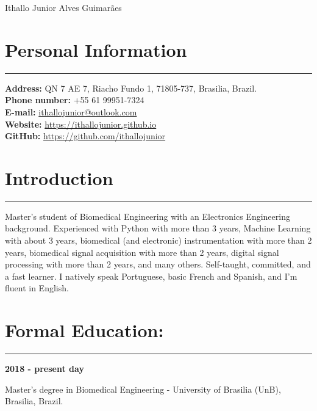\documentclass[11pt]{article}
\begin{document}
\begin{center}
\huge{Ithallo Junior Alves Guimarães}
\end{center}

\section{Personal Information}
\hrule \vspace{0.1cm}

\begin{addmargin}{0.5cm}

\textbf{Address:}  QN 7 AE 7, Riacho Fundo 1, 71805-737, Brasilia, Brazil. \\
\textbf{Phone number:}  +55 61 99951-7324 \\
\textbf{E-mail:}   \href{maito:ithallojunior@outlook.com}{ithallojunior@outlook.com} \\
\textbf{Website:}  \url{https://ithallojunior.github.io}  \\
\textbf{GitHub:} \url{https://github.com/ithallojunior}

\end{addmargin}

\section{Introduction}
\hrule \vspace{0.1cm}

\begin{addmargin}{0.5cm}
Master's student of Biomedical Engineering with an Electronics Engineering background.
Experienced with Python with more than 3 years, Machine Learning with about 3 years, 
biomedical (and electronic) instrumentation with more than 2 years, biomedical signal 
acquisition with more than 2 years, digital signal processing with more than 2 years,
and many others. Self-taught, committed, and a fast learner. I natively speak Portuguese,
basic French and Spanish, and I'm fluent in English.

\end{addmargin}

\section{Formal Education:}
\hrule \vspace{0.1cm}

\textbf{2018 - present day}
\begin{addmargin}{0.5cm}
Master's degree in Biomedical Engineering - University of Brasilia (UnB), Brasilia, Brazil. \\
\end{addmargin}
\end{document}

